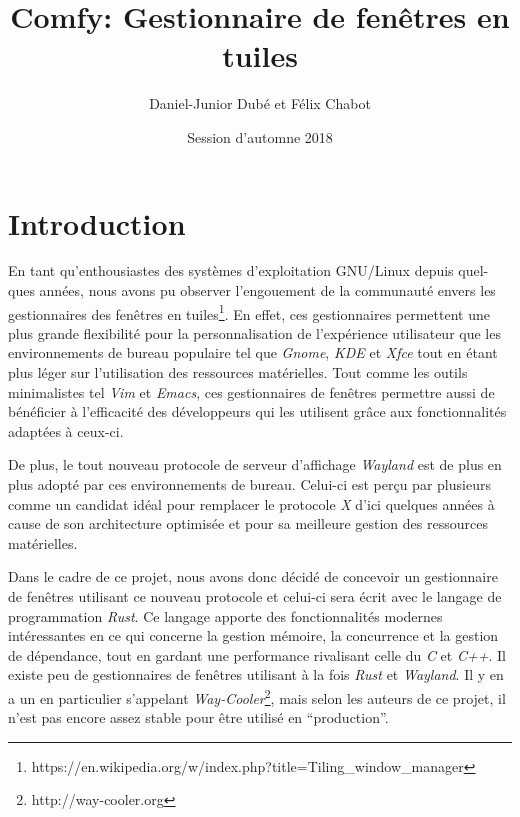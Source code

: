 \documentclass[titlepage]{article}
\title{Comfy: Gestionnaire de fenêtres en tuiles}
\author{Daniel-Junior Dubé et Félix Chabot}
\date{Session d'automne 2018}
\begin{document}
\maketitle

\renewcommand{\contentsname}{Table des matières}
\tableofcontents
\newpage

\section{Introduction}
\par
\bigskip
En tant qu'enthousiastes des systèmes d'exploitation GNU/Linux depuis quel-ques années, nous avons pu observer l’engouement de la communauté envers les gestionnaires des fenêtres en tuiles\footnote{https://en.wikipedia.org/w/index.php?title=Tiling\_window\_manager}. En effet, ces gestionnaires permettent une plus grande flexibilité pour la personnalisation de l’expérience utilisateur que les environnements de bureau populaire tel que \textit{Gnome}, \textit{KDE} et \textit{Xfce} tout en étant plus léger sur l’utilisation des ressources matérielles. Tout comme les outils minimalistes tel \textit{Vim} et \textit{Emacs}, ces gestionnaires de fenêtres permettre aussi de bénéficier à l’efficacité des développeurs qui les utilisent grâce aux fonctionnalités adaptées à ceux-ci.

\par
\bigskip
De plus, le tout nouveau protocole de serveur d'affichage \textit{Wayland} est de plus en plus adopté par ces environnements de bureau. Celui-ci est perçu par plusieurs comme un candidat idéal pour remplacer le protocole \textit{X} d'ici quelques années à cause de son architecture optimisée et pour sa meilleure gestion des ressources matérielles.

\par
\bigskip
Dans le cadre de ce projet, nous avons donc décidé de concevoir un gestionnaire de fenêtres utilisant ce nouveau protocole et celui-ci sera écrit avec le langage de programmation \textit{Rust}. Ce langage apporte des fonctionnalités modernes intéressantes en ce qui concerne la gestion mémoire, la concurrence et la gestion de dépendance, tout en gardant une performance rivalisant celle du \textit{C} et \textit{C++}. Il existe peu de gestionnaires de fenêtres utilisant à la fois \textit{Rust} et \textit{Wayland}. Il y en a un en particulier s’appelant \textit{Way-Cooler}\footnote{http://way-cooler.org}, mais selon les auteurs de ce projet, il n’est pas encore assez stable pour être utilisé en “production”.
\end{document}
